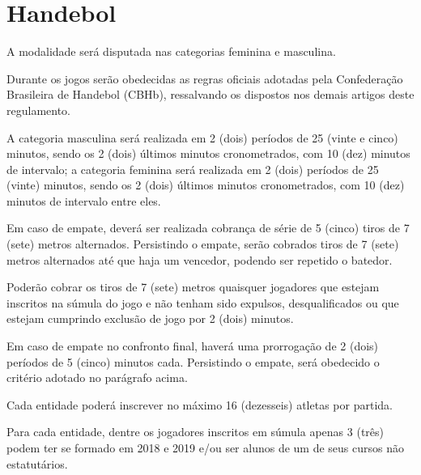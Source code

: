 {\let\clearpage\relax \chapter{Handebol}}

\begin{article}
	A modalidade será disputada nas categorias feminina e masculina.
\end{article}

\begin{article}
	Durante os jogos serão obedecidas as regras oficiais adotadas pela Confederação Brasileira de Handebol (CBHb), ressalvando os dispostos nos demais artigos deste regulamento.
\end{article}

\begin{article}
	A categoria masculina será realizada em 2 (dois) períodos de 25 (vinte e cinco) minutos, sendo os 2 (dois) últimos minutos cronometrados, com 10 (dez) minutos de intervalo; a categoria feminina será realizada em 2 (dois) períodos de 25 (vinte) minutos, sendo os 2 (dois) últimos minutos cronometrados, com 10 (dez) minutos de intervalo entre eles.

	\begin{xparagraph}
		Em caso de empate, deverá ser realizada cobrança de série de 5 (cinco) tiros de 7 (sete) metros alternados. Persistindo o empate, serão cobrados tiros de 7 (sete) metros alternados até que haja um vencedor, podendo ser repetido o batedor.
	\end{xparagraph}

	\begin{xparagraph}
		Poderão cobrar os tiros de 7 (sete) metros quaisquer jogadores que estejam inscritos na súmula do jogo e não tenham sido expulsos, desqualificados ou que estejam cumprindo exclusão de jogo por 2 (dois) minutos.
	\end{xparagraph}

	\begin{xparagraph}
		Em caso de empate no confronto final, haverá uma prorrogação de 2 (dois) períodos de 5 (cinco) minutos cada. Persistindo o empate, será obedecido o critério adotado no parágrafo acima.
	\end{xparagraph}
\end{article}

\begin{article}
	Cada entidade poderá inscrever no máximo 16 (dezesseis) atletas por partida.
\end{article}

\begin{article}
	Para cada entidade, dentre os jogadores inscritos em súmula apenas 3 (três) podem ter se formado em 2018 e 2019 e/ou ser alunos de um de seus cursos não estatutários.
\end{article}
